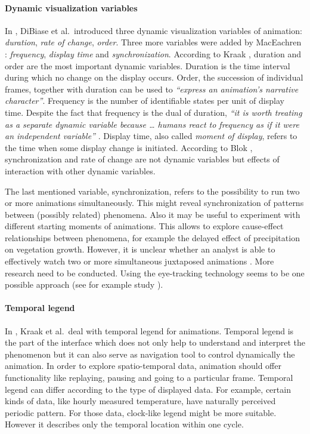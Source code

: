 \documentclass[a4paper,12pt,oneside]{book}
\begin{document}
\paragraph{Dynamic visualization variables}
\label{sec:dynamicVariables}
In \cite{dibiase1992animation}, DiBiase et al.\ introduced three dynamic visualization variables of animation:
\emph{duration}, \emph{rate of change}, \emph{order}.
Three more variables were added by MacEachren \cite{maceachren2004maps}:
\emph{frequency}, \emph{display time} and \emph{synchronization}.
According to Kraak \cite{kraak2000visualisation}, duration and order are the most important
dynamic variables. Duration is the time interval during which no change on the display occurs.
Order, the succession of individual frames, together with duration can be used to
\emph{``express an animation's narrative character''}\cite[p.~31]{kraak2000visualisation}.
Frequency is the number of identifiable states per unit of display time.
Despite the fact that frequency is the dual of duration,
\emph{``it is worth treating as a separate dynamic variable because \ldots
humans react to frequency as if it were an independent variable''} \cite{kraak1994visualization}.
Display time, also called \emph{moment of display}, refers to the time when some display change is initiated.
According to Blok  \cite{blok2005dynamic}, synchronization and rate of change are not dynamic variables
but effects of interaction with other dynamic variables.

The last mentioned variable, synchronization, refers to the possibility to run two or more
animations simultaneously. This might reveal synchronization of patterns between (possibly related) phenomena.
Also it may be useful to experiment with different starting moments of animations.
This allows to explore cause-effect relationships between phenomena, for example
the delayed effect of precipitation on vegetation growth.
However, it is unclear whether an analyst is able to effectively watch two or more simultaneous
juxtaposed animations \cite{andrienko2003exploratory}. More research need to be conducted.
Using the eye-tracking technology seems to be one possible approach
(see for example study \cite{opach2011evaluating}).

\paragraph{Temporal legend}
In \cite{kraak1997cartographic}, Kraak et al.\ deal with temporal legend for animations.
Temporal legend is the part of the interface which does not only help to understand and interpret
the phenomenon but it can also serve as navigation tool to control dynamically the animation.
In order to explore spatio-temporal data, animation should offer functionality like replaying, pausing
and going to a particular frame.
Temporal legend can differ according to the type of displayed data.
For example, certain kinds of data, like hourly measured temperature, have naturally perceived periodic pattern.
For those data, clock-like legend might be more suitable.
However it describes only the temporal location within one cycle.
\end{document}

